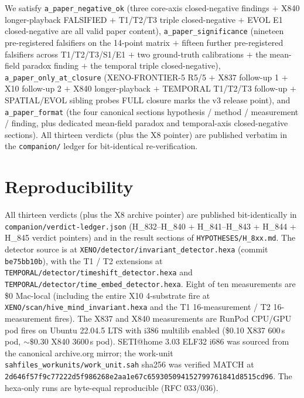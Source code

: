\documentclass[11pt,a4paper]{article}
\begin{document}
We satisfy \texttt{a\_paper\_negative\_ok} (three core-axis closed-negative
findings $+$ X840 longer-playback FALSIFIED $+$ T1/T2/T3 triple
closed-negative $+$ EVOL E1 closed-negative are all valid paper content),
\texttt{a\_paper\_significance} (nineteen pre-registered falsifiers
on the 14-point matrix $+$ fifteen further pre-registered falsifiers
across T1/T2/T3/S1/E1 $+$ two ground-truth calibrations $+$ the
mean-field paradox finding $+$ the temporal triple closed-negative),
\texttt{a\_paper\_only\_at\_closure} (XENO-FRONTIER-5 R5/5 $+$
X837 follow-up 1 $+$ X10 follow-up 2 $+$ X840 longer-playback $+$
TEMPORAL T1/T2/T3 follow-up $+$ SPATIAL/EVOL sibling probes FULL
closure marks the v3 release point), and \texttt{a\_paper\_format}
(the four canonical sections hypothesis / method / measurement /
finding, plus dedicated mean-field paradox and temporal-axis
closed-negative sections). All thirteen verdicts (plus the X8 pointer)
are published verbatim in the \texttt{companion/} ledger for
bit-identical re-verification.

\section*{Reproducibility}
All thirteen verdicts (plus the X8 archive pointer) are published
bit-identically in \texttt{companion/verdict-ledger.json}
(H\_832--H\_840 + H\_841--H\_843 + H\_844 + H\_845 verdict pointers)
and in the result sections of
\texttt{HYPOTHESES/H\_8xx.md}. The detector source is at
\texttt{XENO/detector/invariant\_detector.hexa} (commit
\texttt{be75bb10b}), with the T1 / T2 extensions at
\texttt{TEMPORAL/detector/timeshift\_detector.hexa} and
\texttt{TEMPORAL/detector/time\_embed\_detector.hexa}. Eight of ten
measurements are \$0 Mac-local (including the entire X10
4-substrate fire at \texttt{XENO/scan/hive\_mind\_invariant.hexa}
and the T1 16-measurement / T2 16-measurement fires). The X837 and
X840 measurements are RunPod CPU/GPU pod fires on Ubuntu 22.04.5
LTS with i386 multilib enabled (\$0.10 X837 600\,s pod, $\sim
\$0.30$ X840 3600\,s pod). SETI@home 3.03 ELF32 i686 was sourced
from the canonical archive.org mirror; the work-unit
\texttt{sahfiles\_workunits/work\_unit.sah} sha256 was verified
MATCH at
\texttt{2d646f57f9c77222d5f986268e2aa1e67c659305094152799761841d8515cd96}.
The hexa-only runs are byte-equal reproducible (RFC 033/036).



\end{document}

